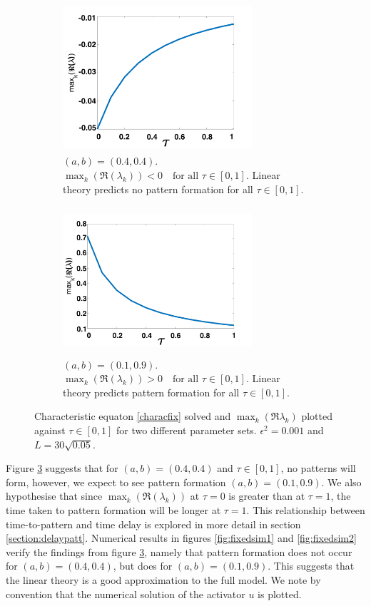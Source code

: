 \begin{figure}[H]
    \centering
    \begin{subfigure}[b]{0.45\textwidth}
        \centering
        \includegraphics[width=7cm,height = 5.5cm]{disp1.png}
        \caption{$(a,b)=(0.4,0.4)$. $\max_k(\Re(\lambda_k))<0 \quad \text{for all }\tau\in[0,1]$. Linear theory predicts no pattern formation for all $\tau\in[0,1]$. }
        \label{}
    \end{subfigure}
    \hfill
    \begin{subfigure}[b]{0.45\textwidth}
        \centering
        \includegraphics[width=7cm,height = 5.5cm]{disp2.png}
        \caption{$(a,b)=(0.1,0.9)$. $\max_k(\Re(\lambda_k))>0 \quad \text{for all }\tau\in[0,1]$. Linear theory predicts pattern formation for all $\tau\in[0, 1]$.}
        \label{}
    \end{subfigure}
    \caption{Characteristic equaton \eqref{characfix} solved and $\max_k(\Re{\lambda_k})$ plotted against $\tau\in[0,1]$ for two different parameter sets. $\epsilon^2=0.001$ and $L=30\sqrt{0.05}$.}
    \label{fig:dispfixed}
\end{figure}
Figure \ref{fig:dispfixed} suggests that for $(a,b)=(0.4,0.4)$ and $\tau\in[0,1]$, no patterns will form, however, we expect to see pattern formation $(a,b)=(0.1,0.9)$. We also hypothesise that since $\max_k(\Re(\lambda_k))$ at $\tau=0$ is greater than at $\tau=1$, the time taken to pattern formation will be longer at $\tau=1$. This relationship between time-to-pattern and time delay is explored in more detail in section \ref{section:delaypatt}. Numerical results in figures \ref{fig:fixedsim1} and \ref{fig:fixedsim2} verify the findings from figure \ref{fig:dispfixed}, namely that pattern formation does not occur for $(a,b)=(0.4,0.4)$, but does for $(a,b)=(0.1,0.9)$.  This suggests that the linear theory is a good approximation to the full model. We note by convention that the numerical solution of the activator $u$ is plotted.
